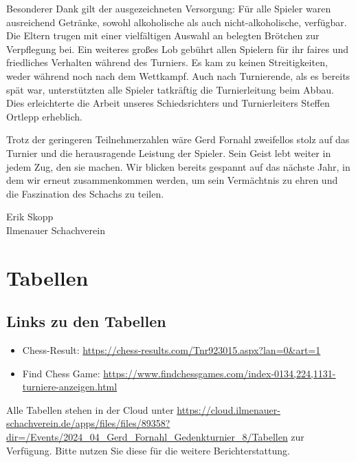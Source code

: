 \documentclass[a4paper,ngerman]{tui-algo-seminar}
\begin{document}
Besonderer Dank gilt der ausgezeichneten Versorgung: Für alle Spieler waren ausreichend Getränke, sowohl alkoholische als auch nicht-alkoholische, verfügbar. Die Eltern trugen mit einer vielfältigen Auswahl an belegten Brötchen zur Verpflegung bei. Ein weiteres großes Lob gebührt allen Spielern für ihr faires und friedliches Verhalten während des Turniers. Es kam zu keinen Streitigkeiten, weder während noch nach dem Wettkampf. Auch nach Turnierende, als es bereits spät war, unterstützten alle Spieler tatkräftig die Turnierleitung beim Abbau. Dies erleichterte die Arbeit unseres Schiedsrichters und Turnierleiters Steffen Ortlepp erheblich.

Trotz der geringeren Teilnehmerzahlen wäre Gerd Fornahl zweifellos stolz auf das Turnier und die herausragende Leistung der Spieler. Sein Geist lebt weiter in jedem Zug, den sie machen. Wir blicken bereits gespannt auf das nächste Jahr, in dem wir erneut zusammenkommen werden, um sein Vermächtnis zu ehren und die Faszination des Schachs zu teilen.\vspace{1cm}

Erik Skopp\\
Ilmenauer Schachverein





\clearpage
\section{Tabellen}
\subsection{Links zu den Tabellen}
\begin{itemize}
    \item Chess-Result: \url{https://chess-results.com/Tnr923015.aspx?lan=0&art=1}
    \item Find Chess Game: \url{https://www.findchessgames.com/index-0134,224,1131-turniere-anzeigen.html}
\end{itemize}


Alle Tabellen stehen in der Cloud unter \url{https://cloud.ilmenauer-schachverein.de/apps/files/files/89358?dir=/Events/2024_04_Gerd_Fornahl_Gedenkturnier_8/Tabellen} zur Verfügung. Bitte nutzen Sie diese für die weitere Berichterstattung. 
\end{document}
